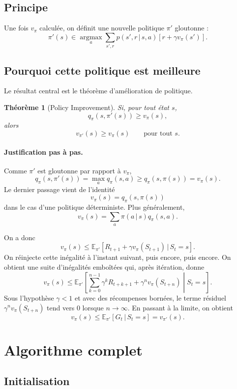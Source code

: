 \documentclass[11pt,a4paper]{article}
\newtheorem*{theoreme}{Théorème}
\newcommand{\E}{\mathbb{E}}
\newcommand{\argmax}{\operatorname*{argmax}}
\newcommand{\given}{\,|\,}
\begin{document}
\subsection{Principe}

Une fois $v_{\pi}$ calculée, on définit une nouvelle politique $\pi'$ gloutonne :
\[
\pi'(s)\in\argmax_a \sum_{s',r}p(s',r\given s,a)\left[r+\gamma v_{\pi}(s')\right].
\]

\subsection{Pourquoi cette politique est meilleure}

Le résultat central est le théorème d'amélioration de politique.

\begin{theoreme}[Policy Improvement]
Si, pour tout état $s$,
\[
q_{\pi}(s,\pi'(s)) \ge v_{\pi}(s),
\]
alors
\[
v_{\pi'}(s)\ge v_{\pi}(s)\qquad \text{pour tout } s.
\]
\end{theoreme}

\paragraph{Justification pas à pas.}
Comme $\pi'$ est gloutonne par rapport à $v_{\pi}$,
\[
q_{\pi}(s,\pi'(s)) = \max_a q_{\pi}(s,a)\ge q_{\pi}(s,\pi(s))=v_{\pi}(s).
\]
Le dernier passage vient de l'identité
\[
v_{\pi}(s)=q_{\pi}(s,\pi(s))
\]
dans le cas d'une politique déterministe. Plus généralement,
\[
v_{\pi}(s)=\sum_a \pi(a\given s)q_{\pi}(s,a).
\]

On a donc
\[
v_{\pi}(s)\le \E_{\pi'}[R_{t+1}+\gamma v_{\pi}(S_{t+1})\given S_t=s].
\]
On réinjecte cette inégalité à l'instant suivant, puis encore, puis encore. On obtient une suite d'inégalités emboîtées qui, après itération, donne
\[
v_{\pi}(s)\le \E_{\pi'}\!\left[\sum_{k=0}^{n-1}\gamma^k R_{t+k+1}+\gamma^n v_{\pi}(S_{t+n}) \middle\vert S_t=s\right].
\]
Sous l'hypothèse $\gamma<1$ et avec des récompenses bornées, le terme résiduel $\gamma^n v_{\pi}(S_{t+n})$ tend vers $0$ lorsque $n\to\infty$. En passant à la limite, on obtient
\[
v_{\pi}(s)\le \E_{\pi'}[G_t\given S_t=s]=v_{\pi'}(s).
\]

\section{Algorithme complet}

\subsection{Initialisation}
\end{document}
